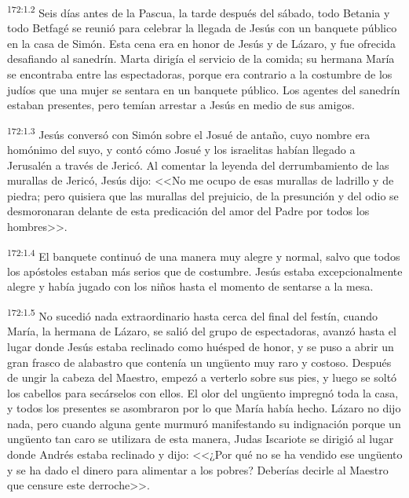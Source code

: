\par 
\textsuperscript{172:1.2} Seis días antes de la Pascua, la tarde después del sábado, todo Betania y todo Betfagé se reunió para celebrar la llegada de Jesús con un banquete público en la casa de Simón. Esta cena era en honor de Jesús y de Lázaro, y fue ofrecida desafiando al sanedrín. Marta dirigía el servicio de la comida; su hermana María se encontraba entre las espectadoras, porque era contrario a la costumbre de los judíos que una mujer se sentara en un banquete público. Los agentes del sanedrín estaban presentes, pero temían arrestar a Jesús en medio de sus amigos.

\par 
\textsuperscript{172:1.3} Jesús conversó con Simón sobre el Josué de antaño, cuyo nombre era homónimo del suyo, y contó cómo Josué y los israelitas habían llegado a Jerusalén a través de Jericó. Al comentar la leyenda del derrumbamiento de las murallas de Jericó, Jesús dijo: <<No me ocupo de esas murallas de ladrillo y de piedra; pero quisiera que las murallas del prejuicio, de la presunción y del odio se desmoronaran delante de esta predicación del amor del Padre por todos los hombres>>.

\par 
\textsuperscript{172:1.4} El banquete continuó de una manera muy alegre y normal, salvo que todos los apóstoles estaban más serios que de costumbre. Jesús estaba excepcionalmente alegre y había jugado con los niños hasta el momento de sentarse a la mesa.

\par 
\textsuperscript{172:1.5} No sucedió nada extraordinario hasta cerca del final del festín, cuando María, la hermana de Lázaro, se salió del grupo de espectadoras, avanzó hasta el lugar donde Jesús estaba reclinado como huésped de honor, y se puso a abrir un gran frasco de alabastro que contenía un ung\"uento muy raro y costoso. Después de ungir la cabeza del Maestro, empezó a verterlo sobre sus pies, y luego se soltó los cabellos para secárselos con ellos. El olor del ung\"uento impregnó toda la casa, y todos los presentes se asombraron por lo que María había hecho. Lázaro no dijo nada, pero cuando alguna gente murmuró manifestando su indignación porque un ung\"uento tan caro se utilizara de esta manera, Judas Iscariote se dirigió al lugar donde Andrés estaba reclinado y dijo: <<¿Por qué no se ha vendido ese ung\"uento y se ha dado el dinero para alimentar a los pobres? Deberías decirle al Maestro que censure este derroche>>.

